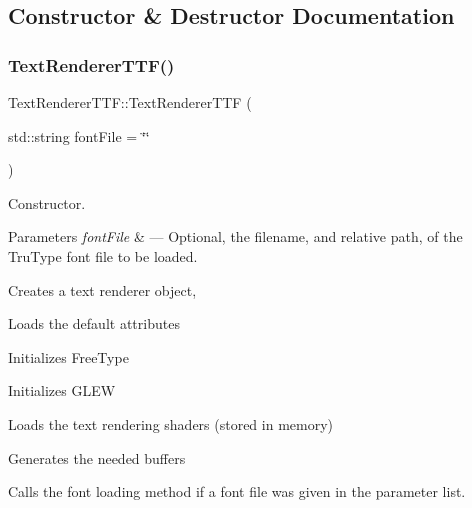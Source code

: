 \subsection{Constructor \& Destructor Documentation}
\mbox{\label{class_text_renderer_t_t_f_a3e2faacd9efeadf1b3e3226798ac720c}} 
\subsubsection{\texorpdfstring{Text\+Renderer\+T\+T\+F()}{TextRendererTTF()}}
{\footnotesize\ttfamily Text\+Renderer\+T\+T\+F\+::\+Text\+Renderer\+T\+TF (\begin{DoxyParamCaption}\item[{std\+::string}]{font\+File = {\ttfamily \char`\"{}\char`\"{}} }\end{DoxyParamCaption})}



Constructor. 


\begin{DoxyParams}{Parameters}
{\em font\+File} & --- Optional, the filename, and relative path, of the Tru\+Type font file to be loaded.\\
\hline
\end{DoxyParams}
Creates a text renderer object,


\begin{DoxyItemize}
\item Loads the default attributes
\item Initializes Free\+Type
\item Initializes G\+L\+EW
\item Loads the text rendering shaders (stored in memory)
\item Generates the needed buffers
\item Calls the font loading method if a font file was given in the parameter list. 
\end{DoxyItemize}\mbox{\label{class_text_renderer_t_t_f_aa516278b8a3837fb84a698a53b9d9323}} 
